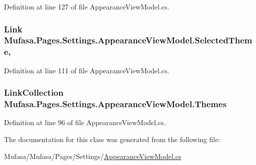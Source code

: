 Definition at line 127 of file Appearance\+View\+Model.\+cs.

\hypertarget{class_mufasa_1_1_pages_1_1_settings_1_1_appearance_view_model_a65d57427e4dffeb4a11a97f5ac1b6661}{
\subsubsection[{Selected\+Theme}]{\setlength{\rightskip}{0pt plus 5cm}Link Mufasa.\+Pages.\+Settings.\+Appearance\+View\+Model.\+Selected\+Theme\hspace{0.3cm}{\ttfamily [get]}, {\ttfamily [set]}}}\label{class_mufasa_1_1_pages_1_1_settings_1_1_appearance_view_model_a65d57427e4dffeb4a11a97f5ac1b6661}


Definition at line 111 of file Appearance\+View\+Model.\+cs.

\hypertarget{class_mufasa_1_1_pages_1_1_settings_1_1_appearance_view_model_a7200169bb6a6634ef182b3c6f009aadc}{
\subsubsection[{Themes}]{\setlength{\rightskip}{0pt plus 5cm}Link\+Collection Mufasa.\+Pages.\+Settings.\+Appearance\+View\+Model.\+Themes\hspace{0.3cm}{\ttfamily [get]}}}\label{class_mufasa_1_1_pages_1_1_settings_1_1_appearance_view_model_a7200169bb6a6634ef182b3c6f009aadc}


Definition at line 96 of file Appearance\+View\+Model.\+cs.



The documentation for this class was generated from the following file\+:\begin{DoxyCompactItemize}
\item 
Mufasa/\+Mufasa/\+Pages/\+Settings/\hyperlink{_appearance_view_model_8cs}{Appearance\+View\+Model.\+cs}\end{DoxyCompactItemize}
